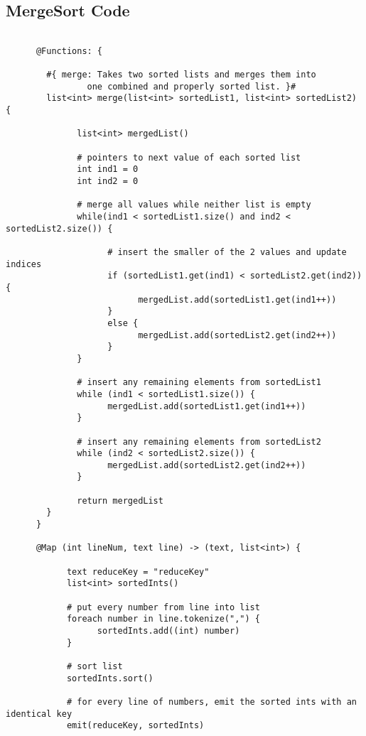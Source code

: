 \documentclass{article} \usepackage{fancyhdr, multicol}
\begin{document}
\subsection*{MergeSort Code}
\begin{verbatim}

      @Functions: {

        #{ merge: Takes two sorted lists and merges them into
                one combined and properly sorted list. }#
        list<int> merge(list<int> sortedList1, list<int> sortedList2) {

              list<int> mergedList()

              # pointers to next value of each sorted list
              int ind1 = 0
              int ind2 = 0

              # merge all values while neither list is empty
              while(ind1 < sortedList1.size() and ind2 < sortedList2.size()) {

                    # insert the smaller of the 2 values and update indices
                    if (sortedList1.get(ind1) < sortedList2.get(ind2)) {
                          mergedList.add(sortedList1.get(ind1++))
                    }
                    else { 
                          mergedList.add(sortedList2.get(ind2++))
                    }
              }

              # insert any remaining elements from sortedList1
              while (ind1 < sortedList1.size()) {
                    mergedList.add(sortedList1.get(ind1++))
              }

              # insert any remaining elements from sortedList2
              while (ind2 < sortedList2.size()) {
                    mergedList.add(sortedList2.get(ind2++))
              }

              return mergedList
        }
      }
      
      @Map (int lineNum, text line) -> (text, list<int>) {

            text reduceKey = "reduceKey"
            list<int> sortedInts()
            
            # put every number from line into list
            foreach number in line.tokenize(",") {
                  sortedInts.add((int) number)
            }
            
            # sort list
            sortedInts.sort()
            
            # for every line of numbers, emit the sorted ints with an identical key
            emit(reduceKey, sortedInts)
      

\end{verbatim}
\end{document}
